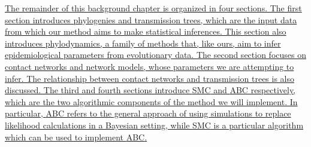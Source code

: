 {\color{blue}\uline{
The remainder of this background chapter is organized in four sections. The
first section introduces phylogenies and transmission trees, which are the
input data from which our method aims to make statistical inferences. This
section also introduces phylodynamics, a family of methods that, like ours, aim
to infer epidemiological parameters from evolutionary data. The second section
focuses on contact networks and network models, whose parameters we are
attempting to infer. The relationship between contact networks and transmission
trees is also discussed. The third and fourth sections introduce \gls{SMC}
and \gls{ABC} respectively, which are the two algorithmic components of the
method we will implement. In particular, \gls{ABC} refers to the general
approach of using simulations to replace likelihood calculations in a Bayesian
setting, while \gls{SMC} is a particular algorithm which can be used to
implement \gls{ABC}. }}

